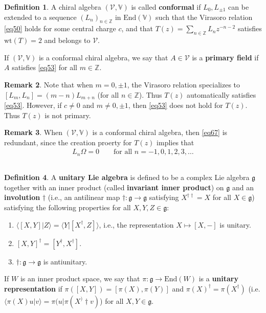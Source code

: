 \documentclass[12pt,b5paper,notitlepage]{article}
\theoremstyle{definition}
\newtheorem{df}{Definition}[section]
\newtheorem{rem}[df]{Remark}
\theoremstyle{plain}
\newcommand{\mc}{\mathcal}
\newcommand{\End}{\mathrm{End}} %
\newcommand{\bk}[1]{\langle {#1}\rangle}
\newcommand{\gk}{\mathfrak g}
\newcommand{\Vbb}{\mathbb V}
\newcommand{\Zbb}{\mathbb Z}
\newcommand{\wt}{\mathrm{wt}}
\numberwithin{equation}{section}
\begin{document}
\begin{df}
A chiral algebra $(\mc V,\Vbb)$ is called \textbf{conformal}  if $L_0,L_{\pm1}$ can be extended to a sequence $(L_n)_{n\in\Zbb}$ in $\End(\Vbb)$ such that the Virasoro relation \eqref{eq50} holds for some central charge $c$, and that $T(z)=\sum_{n\in\Zbb}L_nz^{-n-2}$ satisfies $\wt(T)=2$ and belongs to $\mc V$.

If $(\mc V,\Vbb)$ is a conformal chiral algebra, we say that $A\in \mc V$ is a \textbf{primary field}  if $A$ satisfies \eqref{eq53} for all $m\in\Zbb$. \hfill\qedsymbol
\end{df}

\begin{rem}
Note that when $m=0,\pm 1$, the Virasoro relation specializes to $[L_m,L_n]=(m-n)L_{m+n}$ (for all $n\in\Zbb$). Thus $T(z)$ automatically satisfies \eqref{eq53}. However, if $c\neq 0$ and $m\neq 0,\pm1$, then \eqref{eq53} does not hold for $T(z)$. Thus $T(z)$ is not primary.
\end{rem}


\begin{rem}
When $(\mc V,\Vbb)$ is a conformal chiral algebra, then \eqref{eq67} is redundant, since the creation proerty for $T(z)$ implies that
\begin{align*}
L_n\Omega=0\qquad\text{for all }n=-1,0,1,2,3,\dots
\end{align*}
\end{rem}


\subsection{}


\begin{df}
A \textbf{unitary Lie algebra}   is defined to be a complex Lie algebra $\gk$ together with an inner product (called \textbf{invariant inner product})  on $\gk$ and an \textbf{involution}  $\dagger$ (i.e., an antilinear map $\dagger:\gk\rightarrow\gk$ satisfying $X^{\dagger\dagger}=X$ for all $X\in\gk$) satisfying the following properties for all $X,Y,Z\in\gk$:
\begin{enumerate}[label=(\arabic*)]
\item $\bk{[X,Y]|Z}=\bk{Y|[X^\dagger,Z]}$, i.e., the representation $X\mapsto [X,-]$ is unitary.
\item $[X,Y]^\dagger=[Y^\dagger,X^\dagger]$.
\item $\dagger:\gk\rightarrow\gk$ is antiunitary. 
\end{enumerate}
If $W$ is an inner product space, we say that $\pi:\gk\rightarrow\End(W)$ is a \textbf{unitary representation} if $\pi([X,Y])=[\pi(X),\pi(Y)]$ and $\pi(X)^\dagger=\pi(X^\dagger)$ (i.e. $\bk{\pi(X)u|v}=\pi(u|\pi(X^)\dagger v)$) for all $X,Y\in\gk$. 
\end{df}
\end{document}
